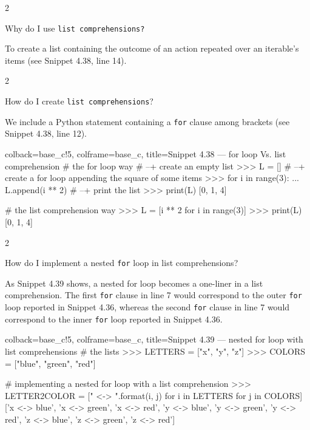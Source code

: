 \documentclass[a4paper,11pt]{book}
\newcommand{\question}[1]{%
    \begin{tcolorbox}[colback=comp_c!10,colframe=comp_c,sidebyside align=top,width=\linewidth,before skip=1ex]
        #1
    \end{tcolorbox}
    \switchcolumn%
}
\newcommand{\note}[1]{%
    \begin{tcolorbox}[colback=white!0,colframe=white!10,width=\linewidth,before skip=1ex]
        #1
    \end{tcolorbox}
}
\begin{document}
\begin{paracol}{2}
	\question{\raggedright Why do I use \texttt{list comprehensions?}}
	\note{To create a list containing the outcome of an action repeated over an iterable's items (see Snippet 4.38, line 14).}
\end{paracol}

\begin{paracol}{2}
	\question{\raggedright How do I create \texttt{list comprehensions}?}
	\note{We include a Python statement containing a \texttt{for} clause among brackets (see Snippet 4.38, line 12).}
\end{paracol}
\clearpage

\begin{pythoncode}[linenos=true,]{colback=base_c!5, colframe=base_c, title=\sffamily Snippet 4.38 --- for loop Vs. list comprehension}
# the for loop way
# --+ create an empty list
>>> L = []
# --+ create a for loop appending the square of some items
>>> for i in range(3):
...    L.append(i ** 2)
# --+ print the list
>>> print(L)
[0, 1, 4]

# the list comprehension way
>>> L = [i ** 2 for i in range(3)]
>>> print(L)
[0, 1, 4]

\end{pythoncode}

\begin{paracol}{2}
	\question{\raggedright How do I implement a nested \texttt{for} loop in list comprehensions?}
	\note{As Snippet 4.39 shows, a nested for loop becomes a one-liner in a list comprehension. The first \texttt{for} clause in line 7 would correspond to the outer \texttt{for} loop reported in Snippet 4.36, whereas the second \texttt{for} clause in line 7 would correspond to the inner \texttt{for} loop reported in Snippet 4.36.}
\end{paracol}

\begin{pythoncode}[linenos=true,]{colback=base_c!5, colframe=base_c, title=\sffamily Snippet 4.39 --- nested for loop with list comprehensions}
# the lists 
>>> LETTERS = ["x", "y", "z"]
>>> COLORS = ["blue", "green", "red"]

# implementing a nested for loop with a list comprehension
>>> LETTER2COLOR = ["{} <-> {}".format(i, j) for i in LETTERS for j in COLORS]
['x <-> blue',
 'x <-> green',
 'x <-> red',
 'y <-> blue',
 'y <-> green',
 'y <-> red',
 'z <-> blue',
 'z <-> green',
 'z <-> red']
\end{pythoncode}
\end{document}
